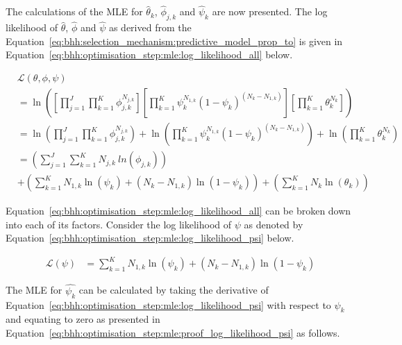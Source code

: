 The calculations of the \ac{MLE} for $\hat{\theta}_{k}$, $\hat{\phi}_{j,k}$ and
$\hat{\psi}_{k}$ are now presented. The log likelihood of $\hat{\theta}$, $\hat{\phi}$ and $\hat{\psi}$ as derived
from the Equation~\eqref{eq:bhh:selection_mechanism:predictive_model_prop_to} is given in Equation~\eqref{eq:bhh:optimisation_step:mle:log_likelihood_all} below.

\begin{equation}
      \label{eq:bhh:optimisation_step:mle:log_likelihood_all}
      \begin{split}
            & \mathcal{L}(\theta, \phi, \psi) \\
            &= \ln\left(\left[ \prod_{j=1}^{J} \prod_{k=1}^{K} \phi_{j,k}^{N_{j,k}} \right] \left[ \prod_{k=1}^{K} \psi_{k}^{N_{1,k}} (1 - \psi_{k})^{(N_{k} - N_{1,k})} \right] \left[ \prod_{k=1}^{K} \theta_{k}^{N_{k}} \right] \right) \\
            &= \ln \left( \prod_{j=1}^{J} \prod_{k=1}^{K} \phi_{j,k}^{N_{j,k}} \right) +  \ln \left( \prod_{k=1}^{K} \psi_{k}^{N_{1,k}} (1 - \psi_{k})^{(N_{k} - N_{1,k})} \right) + \ln \left( \prod_{k=1}^{K} \theta_{k}^{N_{k}} \right) \\
            &= \left( \sum_{j=1}^{J} \sum_{k=1}^{K} N_{j,k} \ ln \left( \phi_{j,k}
            \right) \right) \\
            &+ \left( \sum_{k=1}^{K} N_{1,k} \ln \left( \psi_{k} \right) + \left( N_{k} - N_{1,k} \right) \ln \left( 1 - \psi_{k} \right) \right) + \left( \sum_{k=1}^{K} N_{k} \ln \left( \theta_{k} \right) \right)
      \end{split}
\end{equation}

Equation~\eqref{eq:bhh:optimisation_step:mle:log_likelihood_all} can be broken down into each of its factors. Consider the log likelihood of $\psi$  as denoted by Equation~\eqref{eq:bhh:optimisation_step:mle:log_likelihood_psi} below.

\begin{equation}
      \label{eq:bhh:optimisation_step:mle:log_likelihood_psi}
      \begin{split}
            \mathcal{L}(\psi) &=  \sum_{k=1}^{K} N_{1,k} \ln \left( \psi_{k} \right) + \left( N_{k} - N_{1,k} \right) \ln \left( 1 - \psi_{k} \right)
      \end{split}
\end{equation}

The MLE for $\hat{\psi_{k}} $ can be calculated by taking the derivative of Equation~\eqref{eq:bhh:optimisation_step:mle:log_likelihood_psi} with respect to $\psi_{k}$ and equating to zero as presented in Equation~\eqref{eq:bhh:optimisation_step:mle:proof_log_likelihood_psi} as follows.

